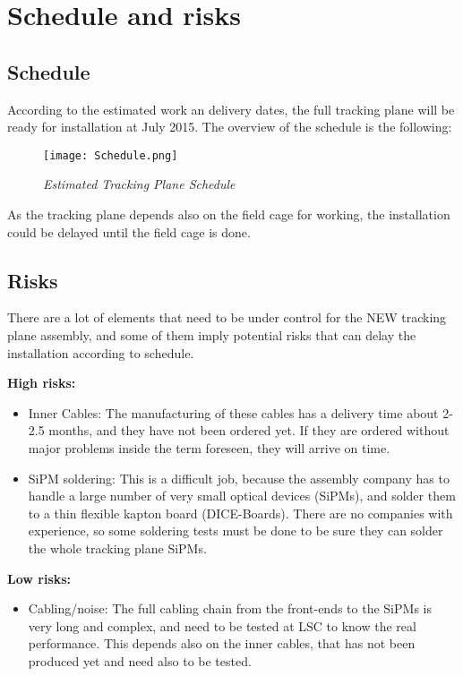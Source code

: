 \section{Schedule and risks}

\subsection{Schedule}

According to the estimated work an delivery dates, the full tracking plane will be ready for installation at July 2015. The overview of the schedule is the following:

\begin{figure}[h!]
  \centering
  \texttt{[image: Schedule.png]} 
  \caption{\textit{Estimated Tracking Plane Schedule}}
  \label{fig:schedule}
\end{figure}

As the tracking plane depends also on the field cage for working, the installation could be delayed until the field cage is done.

\subsection{Risks}

There are a lot of elements that need to be under control for the NEW tracking plane assembly, and some of them imply potential risks that can delay the installation according to schedule.

\textbf{High risks:}
\begin{itemize}
\item Inner Cables: The manufacturing of these cables has a delivery time about 2-2.5 months, and they have not been ordered yet. If they are ordered without major problems inside the term foreseen, they will arrive on time.

\item SiPM soldering: This is a difficult job, because the assembly company has to handle a large number of very small optical devices (SiPMs), and solder them to a thin flexible kapton board (DICE-Boards). There are no companies with experience, so some soldering tests must be done to be sure they can solder the whole tracking plane SiPMs.
\end{itemize}

\textbf{Low risks:}
\begin{itemize}
\item Cabling/noise: The full cabling chain from the front-ends to the SiPMs is very long and complex, and need to be tested at LSC to know the real performance. This depends also on the inner cables, that has not been produced yet and need also to be tested.
\end{itemize}

